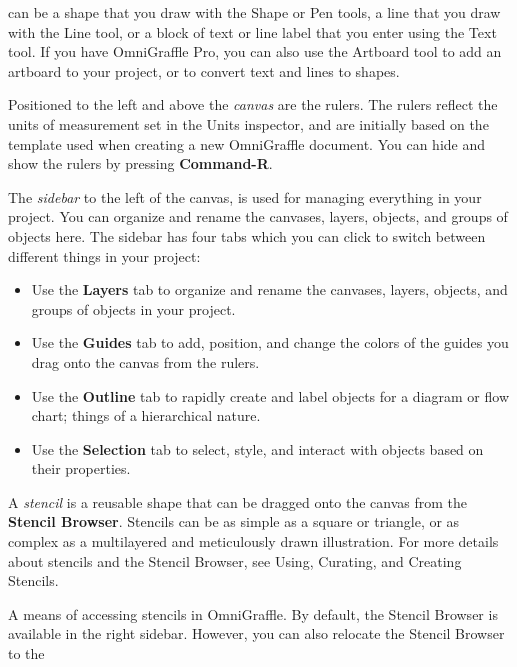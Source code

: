 \documentclass[../main.tex]{subfiles}
\begin{document}
\begin{description}[
      style=nextline,
    ]
    can be a
    shape that you draw with the Shape or Pen tools, a line that you draw with the Line tool, or
    a block of
    text or line label that you enter using the Text tool. If you have OmniGraffle Pro, you can
    also use the
    Artboard tool to add an artboard to your project, or to convert text and lines to shapes.
  \item[Ruler] Positioned to the left and above the \textit{canvas} are the rulers. The rulers
    reflect the
    units of measurement set in the Units inspector, and are initially based on the template
    used when
    creating a new OmniGraffle document. You can hide and show the rulers by pressing
    \textbf{Command-R}.
  \item[Sidebar] The \textit{sidebar} to the left of the canvas, is used for managing everything
    in your
    project. You can organize and rename the canvases, layers, objects, and groups of objects
    here. The
    sidebar has four tabs which you can click to switch between different things in your
    project:
    \begin{itemize}[
          leftmargin=3em,
        ]
      \item Use the \textbf{Layers} tab to organize and rename the canvases, layers, objects,
        and groups of
        objects in your project.
      \item Use the \textbf{Guides} tab to add, position, and change the colors of the guides
        you drag onto
        the canvas from the rulers.
      \item Use the \textbf{Outline} tab to rapidly create and label objects for a diagram or
        flow chart;
        things of a hierarchical nature.
      \item Use the \textbf{Selection} tab to select, style, and interact with objects based on
        their properties.
    \end{itemize}
  \item[Stencil] A \textit{stencil} is a reusable shape that can be dragged onto the canvas from
    the
    \textbf{Stencil Browser}. Stencils can be as simple as a square or triangle, or as complex
    as a
    multilayered and meticulously drawn illustration. For more details about stencils and the
    Stencil
    Browser, see Using, Curating, and Creating Stencils.
  \item[Stencil Browser] A means of accessing stencils in OmniGraffle. By default, the Stencil
    Browser is
    available in the right sidebar. However, you can also relocate the Stencil Browser to the

\end{description}
\end{document}

